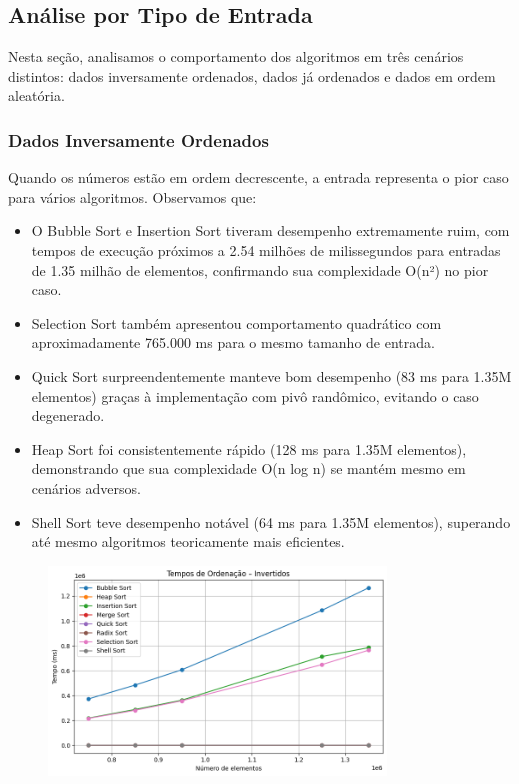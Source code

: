 \documentclass[a4paper, 12pt]{article}
\begin{document}
    \subsection{Análise por Tipo de Entrada}
        Nesta seção, analisamos o comportamento dos algoritmos em três cenários distintos: dados inversamente ordenados, dados já ordenados e dados em ordem aleatória.

        \subsubsection{Dados Inversamente Ordenados}
            Quando os números estão em ordem decrescente, a entrada representa o pior caso para vários algoritmos. Observamos que:

            \begin{itemize}
                \item O Bubble Sort e Insertion Sort tiveram desempenho extremamente ruim, com tempos de execução próximos a 2.54 milhões de milissegundos para entradas de 1.35 milhão de elementos, confirmando sua complexidade O(n²) no pior caso.
                \item Selection Sort também apresentou comportamento quadrático com aproximadamente 765.000 ms para o mesmo tamanho de entrada.
                \item Quick Sort surpreendentemente manteve bom desempenho (83 ms para 1.35M elementos) graças à implementação com pivô randômico, evitando o caso degenerado.
                \item Heap Sort foi consistentemente rápido (128 ms para 1.35M elementos), demonstrando que sua complexidade O(n log n) se mantém mesmo em cenários adversos.
                \item Shell Sort teve desempenho notável (64 ms para 1.35M elementos), superando até mesmo algoritmos teoricamente mais eficientes.
            \end{itemize}

            \begin{figure}[ht]
                \centering
                \includegraphics[width=0.8\textwidth]{images/invertidos.png}
            \end{figure}
\end{document}
